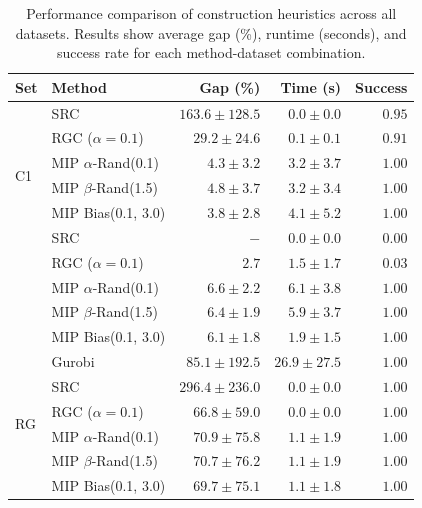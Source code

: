 \documentclass[twocolumn, switch]{article} %
\begin{document}
\begin{table}[h]
    \caption{Performance comparison of construction heuristics across all datasets. Results show average gap (\%), runtime (seconds), and success rate for each method-dataset combination.}
    \label{tab:construction_comparison}
    \centering
    \setlength{\tabcolsep}{2.1pt}
    \begin{tabular}{llrrr}
        \toprule
        \textbf{Set} & \textbf{Method} & \textbf{Gap (\%)} & \textbf{Time (s)} & \textbf{Success} \\
        \midrule
        \multirow[c]{6}{*}{C1} & SRC & $163.6 \pm 128.5$ & $0.0 \pm 0.0$ & $0.95$ \\
        & RGC ($\alpha = 0.1$) & $29.2 \pm 24.6$ & $0.1 \pm 0.1$ & $0.91$ \\
        & MIP $\alpha$-Rand(0.1) & $4.3 \pm 3.2$ & $3.2 \pm 3.7$ & $1.00$ \\
        & MIP $\beta$-Rand(1.5) & $4.8 \pm 3.7$ & $3.2 \pm 3.4$ & $1.00$ \\
        & MIP Bias(0.1, 3.0) & $\mathbf{3.8 \pm 2.8}$ & $4.1 \pm 5.2$ & $1.00$ \\
        \midrule
        \multirow[c]{6}{*}{C2} & SRC & $-$ & $0.0 \pm 0.0$ & $0.00$ \\
        & RGC ($\alpha = 0.1$) & $2.7$ & $1.5 \pm 1.7$ & $0.03$ \\
        & MIP $\alpha$-Rand(0.1) & $6.6 \pm 2.2$ & $6.1 \pm 3.8$ & $1.00$ \\
        & MIP $\beta$-Rand(1.5) & $6.4 \pm 1.9$ & $5.9 \pm 3.7$ & $1.00$ \\
        & MIP Bias(0.1, 3.0) & $\mathbf{6.1 \pm 1.8}$ & $1.9 \pm 1.5$ & $1.00$ \\
        \midrule
        \multirow[c]{6}{*}{RG} & Gurobi & $85.1 \pm 192.5$ & $26.9 \pm 27.5$ & $1.00$ \\
        & SRC & $296.4 \pm 236.0$ & $0.0 \pm 0.0$ & $1.00$ \\
        & RGC ($\alpha = 0.1$) & $66.8 \pm 59.0$ & $0.0 \pm 0.0$ & $1.00$ \\
        & MIP $\alpha$-Rand(0.1) & $70.9 \pm 75.8$ & $1.1 \pm 1.9$ & $1.00$ \\
        & MIP $\beta$-Rand(1.5) & $70.7 \pm 76.2$ & $1.1 \pm 1.9$ & $1.00$ \\
        & MIP Bias(0.1, 3.0) & $\mathbf{69.7 \pm 75.1}$ & $1.1 \pm 1.8$ & $1.00$ \\
        \bottomrule
    \end{tabular}
\end{table}
\end{document}
